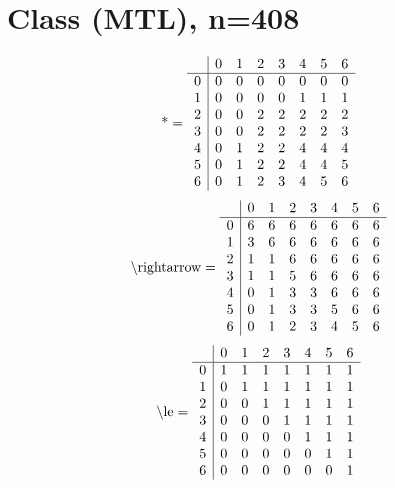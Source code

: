 \documentclass[11pt]{article}
\begin{document}
\section{Class (MTL), n=408}
\[\text{*} = 
\begin{array}{r | r r r r r r r}
 & 0 & 1 & 2 & 3 & 4 & 5 & 6 \\ \hline
0 & 0 & 0 & 0 & 0 & 0 & 0 & 0 \\
1 & 0 & 0 & 0 & 0 & 1 & 1 & 1 \\
2 & 0 & 0 & 2 & 2 & 2 & 2 & 2 \\
3 & 0 & 0 & 2 & 2 & 2 & 2 & 3 \\
4 & 0 & 1 & 2 & 2 & 4 & 4 & 4 \\
5 & 0 & 1 & 2 & 2 & 4 & 4 & 5 \\
6 & 0 & 1 & 2 & 3 & 4 & 5 & 6 \\
\end{array}
\]
\[\text{\textbackslash rightarrow} = 
\begin{array}{r | r r r r r r r}
 & 0 & 1 & 2 & 3 & 4 & 5 & 6 \\ \hline
0 & 6 & 6 & 6 & 6 & 6 & 6 & 6 \\
1 & 3 & 6 & 6 & 6 & 6 & 6 & 6 \\
2 & 1 & 1 & 6 & 6 & 6 & 6 & 6 \\
3 & 1 & 1 & 5 & 6 & 6 & 6 & 6 \\
4 & 0 & 1 & 3 & 3 & 6 & 6 & 6 \\
5 & 0 & 1 & 3 & 3 & 5 & 6 & 6 \\
6 & 0 & 1 & 2 & 3 & 4 & 5 & 6 \\
\end{array}
\]
\[\text{\textbackslash le} = 
\begin{array}{r | r r r r r r r}
 & 0 & 1 & 2 & 3 & 4 & 5 & 6 \\ \hline
0 & 1 & 1 & 1 & 1 & 1 & 1 & 1 \\
1 & 0 & 1 & 1 & 1 & 1 & 1 & 1 \\
2 & 0 & 0 & 1 & 1 & 1 & 1 & 1 \\
3 & 0 & 0 & 0 & 1 & 1 & 1 & 1 \\
4 & 0 & 0 & 0 & 0 & 1 & 1 & 1 \\
5 & 0 & 0 & 0 & 0 & 0 & 1 & 1 \\
6 & 0 & 0 & 0 & 0 & 0 & 0 & 1 \\
\end{array}
\]
\end{document}
